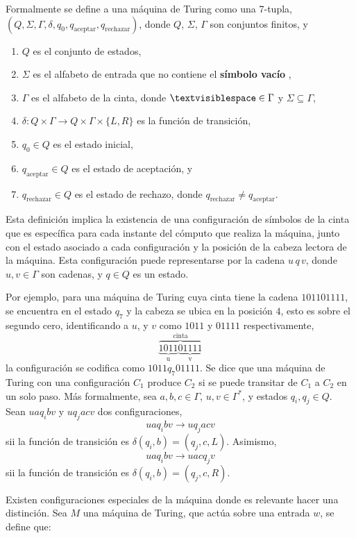 \documentclass[10pt,a4paper]{article}
\begin{document}
Formalmente se define a una máquina de Turing como una 7-tupla, $(Q,\Sigma, \Gamma, \delta, q_0, q_{\text{aceptar}},q_{\text{rechazar}})$, donde $Q$, $\Sigma$, $\Gamma$ son conjuntos finitos, y
\begin{enumerate}
	\item $Q$ es el conjunto de estados,
	\item $\Sigma$ es el alfabeto de entrada que no contiene el \textbf{símbolo vacío} \textvisiblespace,
	\item $\Gamma$ es el alfabeto de la cinta, donde $\textvisiblespace \in \Gamma$ y $\Sigma \subseteq \Gamma$,
	\item $\delta : Q \times \Gamma \rightarrow Q \times \Gamma \times \{ L, R \}$ es la función de transición,
	\item $q_0 \in Q$ es el estado inicial,
	\item $q_{\text{aceptar}} \in Q$ es el estado de aceptación, y
	\item $q_{\text{rechazar}} \in Q$ es el estado de rechazo, donde $q_{\text{rechazar}} \neq q_{\text{aceptar}}$.
\end{enumerate}

Esta definición implica la existencia de una configuración de símbolos de la cinta que es específica para cada instante del cómputo que realiza la máquina, junto con el estado asociado a cada configuración y la posición de la cabeza lectora de la máquina. Esta configuración puede representarse por la cadena $u \, q \, v$, donde $u, v \in \Gamma$ son cadenas, y $q \in Q$ es un estado.

Por ejemplo, para una máquina de Turing cuya cinta tiene la cadena $101101111$, se encuentra en el estado $q_7$ y la cabeza se ubica en la posición $4$, esto es sobre el segundo cero, identificando a $u$, y $v$ como $1011$ y $01111$ respectivamente,
\[	
\overbrace{ \underbrace{1011}_\text{u} \underbrace{01111}_\text{v}}^\text{cinta}
\]
la configuración se codifica como $1011q_7 01111$.
Se dice que una máquina de Turing con una configuración $C_1$ produce $C_2$ si se puede transitar de $C_1$ a $C_2$ en un solo paso. Más formalmente, sea $a, b, c \in \Gamma$, $u, v \in \Gamma^*$, y estados $q_i, q_j \in Q$. Sean $u a q_i b v$ y $u q_j a c v$ dos configuraciones,
\[
	u a q_i b v \rightarrow u q_j a c v
\]
sii la función de transición es $\delta(q_i, b) = (q_j, c, L)$. Asimismo,
\[
	u a q_i b v \rightarrow u a c q_j v
\]
sii la función de transición es $\delta(q_i, b) = (q_j, c, R)$.

Existen configuraciones especiales de la máquina donde es relevante hacer una distinción. Sea $M$ una máquina de Turing, que actúa sobre una entrada $w$, se define que:
\end{document}
